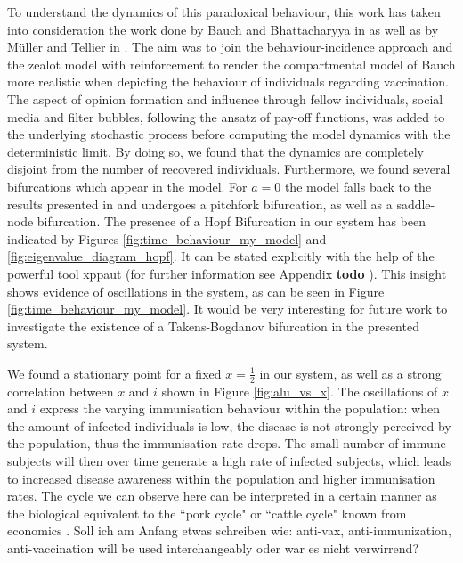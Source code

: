 \documentclass[12pt,a4paper,twoside]{article}
\begin{document}
To understand the dynamics of this paradoxical behaviour, this work has taken into consideration the work done by Bauch and Bhattacharyya in \cite{Bauch2012} as well as by M\"uller and Tellier in \cite{JohannesMuller2020}. The aim was to join the behaviour-incidence approach and the zealot model with reinforcement to render the compartmental model of Bauch more realistic when depicting the behaviour of individuals regarding vaccination. The aspect of opinion formation and influence through fellow individuals, social media and filter bubbles, following the ansatz of pay-off functions, was added to the underlying stochastic process before computing the model dynamics with the deterministic limit. By doing so, we found that the dynamics are completely disjoint from the number of recovered individuals. Furthermore, we found several bifurcations which appear in the model. For $a=0$ the model falls back to the results presented in \cite{JohannesMuller2020} and undergoes a pitchfork bifurcation, as well as a saddle-node bifurcation. The presence of a Hopf Bifurcation in our system has been indicated by Figures \ref{fig:time_behaviour_my_model} and \ref{fig:eigenvalue_diagram_hopf}. It can be stated explicitly with the help of the powerful tool xppaut (for further information see Appendix \textbf{todo}%
 ). This insight shows evidence of oscillations in the system, as can be seen in Figure \eqref{fig:time_behaviour_my_model}. It would be very interesting for future work to investigate the existence of a Takens-Bogdanov bifurcation in the presented system.\newline
 
 We found a stationary point for a fixed $x = \frac{1}{2}$ in our system, as well as a strong correlation between $x$ and $i$ shown in Figure \ref{fig:alu_vs_x}. The oscillations of $x$ and $i$ express the varying immunisation behaviour within the population: when the amount of infected individuals is low, the disease is not strongly perceived by the population, thus the immunisation rate drops. The small number of immune subjects will then over time generate a high rate of infected subjects, which leads to increased disease awareness within the population and higher immunisation rates. The cycle we can observe here can be interpreted in a certain manner as the biological equivalent to the ``pork cycle" or ``cattle cycle" known from economics \cite{Rosen1994}. %
 \newline\newline
 Soll ich am Anfang etwas schreiben wie: anti-vax, anti-immunization, anti-vaccination will be used interchangeably oder war es nicht verwirrend?

\newpage

\printbibliography

%
\end{document}
